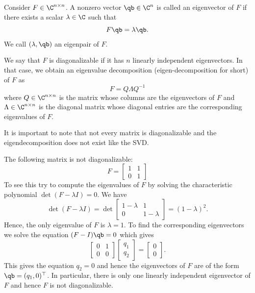 \begin{definition}
    Consider $F \in \C^{n \times n}$. A nonzero vector $\qb \in \C^n$ is called an eigenvector of $F$ if there exists a scalar $\lambda \in \C$ such that
    \begin{equation*}
        F \qb = \lambda \qb.
    \end{equation*}
    We call $(\lambda, \qb)$ an eigenpair of $F$.
\end{definition}
We say that $F$ is diagonalizable if it has $n$ 
linearly independent eigenvectors. In that case, we obtain an eigenvalue 
decomposition (eigen-decomposition for short) of $F$ as
\begin{equation*}
    F = Q \Lambda Q^{-1}
\end{equation*}
where $Q \in \C^{n \times n}$ is the matrix whose columns are
the eigenvectors of $F$ and $\Lambda \in \C^{n \times n}$ is the diagonal matrix whose diagonal entries are the corresponding eigenvalues of $F$.

It is important to note that not every matrix is diagonalizable 
and the eigendecomposition does not exist like the SVD.

\begin{example}
    The following matrix is not diagonalizable:
    \begin{equation*}
        F 
= \begin{bmatrix}
            1 & 1 \\
            0 & 1
        \end{bmatrix}
    \end{equation*}
To see this try to compute the eigenvalues of $F$ by solving the characteristic polynomial $\det(F - \lambda I) = 0$. We have
\begin{equation*}
    \det(F - \lambda I) = \det\begin{bmatrix}
        1 - \lambda & 1 \\
        0 & 1 - \lambda
    \end{bmatrix} = (1 - \lambda)^2.
\end{equation*}
Hence, the only eigenvalue of $F$ is $\lambda = 1$. To find the corresponding eigenvectors we solve the equation $(F - I)\qb = 0$ which gives
\begin{equation*}
    \begin{bmatrix}
        0 & 1 \\
        0 & 0
    \end{bmatrix} \begin{bmatrix}
        q_1 \\
        q_2
    \end{bmatrix} = \begin{bmatrix}
        0 \\
        0
    \end{bmatrix}.
\end{equation*}
This gives the equation $q_2 = 0$ and hence the eigenvectors of $F$ are of the form $\qb = (q_1, 0)^\top$. In particular, there is only one linearly independent eigenvector of $F$ and hence $F$ is not diagonalizable.
\end{example}


